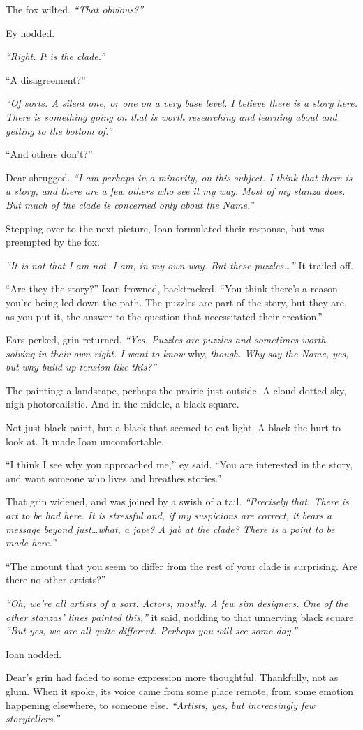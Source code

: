 The fox wilted. \emph{``That obvious?''}

Ey nodded.

\emph{``Right. It is the clade.''}

``A disagreement?''

\emph{``Of sorts. A silent one, or one on a very base level. I believe there is a story here. There is something going on that is worth researching and learning about and getting to the bottom of.''}

``And others don't?''

Dear shrugged. \emph{``I am perhaps in a minority, on this subject. I think that there is a story, and there are a few others who see it my way. Most of my stanza does. But much of the clade is concerned only about the Name.''}

Stepping over to the next picture, Ioan formulated their response, but was preempted by the fox.

\emph{``It is not that I am not. I am, in my own way. But these puzzles\ldots{}''} It trailed off.

``Are they the story?'' Ioan frowned, backtracked. ``You think there's a reason you're being led down the path. The puzzles are part of the story, but they are, as you put it, the answer to the question that necessitated their creation.''

Ears perked, grin returned. \emph{``Yes. Puzzles are puzzles and sometimes worth solving in their own right. I want to know} why, \emph{though. Why say the Name, yes, but why build up tension like this?''}

The painting: a landscape, perhaps the prairie just outside. A cloud-dotted sky, nigh photorealistic. And in the middle, a black square.

Not just black paint, but a black that seemed to eat light. A black the hurt to look at. It made Ioan uncomfortable.

``I think I see why you approached me,'' ey said. ``You are interested in the story, and want someone who lives and breathes stories.''

That grin widened, and was joined by a swish of a tail. \emph{``Precisely that. There is art to be had here. It is stressful and, if my suspicions are correct, it bears a message beyond just\ldots{}what, a jape? A jab at the clade? There is a point to be made here.''}

``The amount that you seem to differ from the rest of your clade is surprising. Are there no other artists?''

\emph{``Oh, we're all artists of a sort. Actors, mostly. A few sim designers. One of the other stanzas' lines painted this,''} it said, nodding to that unnerving black square. \emph{``But yes, we are all quite different. Perhaps you will see some day.''}

Ioan nodded.

Dear's grin had faded to some expression more thoughtful. Thankfully, not as glum. When it spoke, its voice came from some place remote, from some emotion happening elsewhere, to someone else. \emph{``Artists, yes, but increasingly few storytellers.''}

